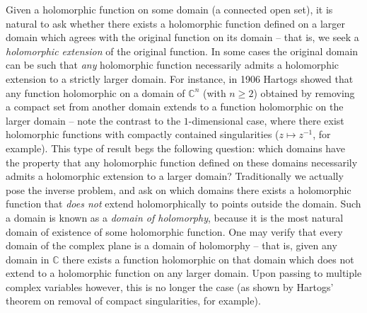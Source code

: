 \documentclass[11pt,a4paper, final, twoside]{article}
\numberwithin{equation}{section}
\newcommand{\C}{\mathbb C}
\begin{document}
Given a holomorphic function on some domain (a connected open set), it is natural to ask whether there exists a holomorphic function defined on a larger domain which agrees with the original
function on its domain -- that is, we seek a \emph{holomorphic extension} of the original function. In some cases the original domain can be such that \emph{any} holomorphic function necessarily admits
a holomorphic extension to a strictly larger domain.
For instance, in 1906 Hartogs showed that any function holomorphic on a domain of $\C^n$ (with $n\geq 2$) obtained by removing a compact set from another domain extends to a function
holomorphic on
the larger domain \cite{hartogs1906} -- note the contrast to the $1$-dimensional case, where there exist holomorphic functions with compactly contained singularities ($z\mapsto z^{-1}$, for example).
 This type
of result begs the following question: which domains have the property that any holomorphic function defined on these domains necessarily admits a holomorphic extension to a larger domain? Traditionally
we actually pose the inverse problem,
and ask on which domains there exists a holomorphic function that \emph{does not} extend holomorphically to points outside the domain. Such a domain is known as a \emph{domain of holomorphy},
because it is the most natural domain of existence of some holomorphic function. One may verify that every domain of the complex plane is a domain of holomorphy -- that is, given any domain
in $\C$ there exists a function holomorphic on that domain which does not extend to a holomorphic function on any larger domain. Upon passing to multiple complex variables however, this is no longer
the case (as shown by Hartogs' theorem on removal of compact singularities, for example).
\end{document}
